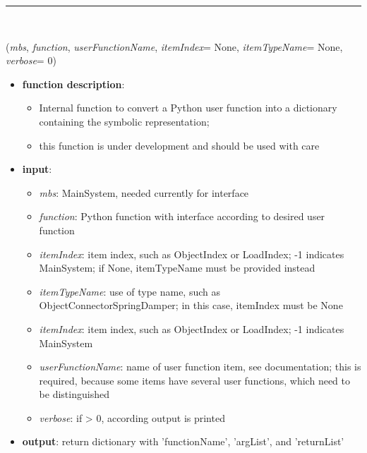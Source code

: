 \begin{itemize}[leftmargin=1.4cm]
%
\noindent\rule{8cm}{0.75pt}\vspace{1pt} \\ 
\begin{flushleft}
\label{sec:advancedUtilities:ConvertFunctionToSymbolic}
({\it mbs}, {\it function}, {\it userFunctionName}, {\it itemIndex}= None, {\it itemTypeName}= None, {\it verbose}= 0)
\end{flushleft}
\setlength{\itemindent}{0.7cm}
\begin{itemize}[leftmargin=0.7cm]
\item[--]
{\bf function description}: \vspace{-6pt}
\begin{itemize}[leftmargin=1.2cm]
\setlength{\itemindent}{-0.7cm}
\item[]Internal function to convert a Python user function into a dictionary containing the symbolic representation;
\item[]this function is under development and should be used with care
\end{itemize}
\item[--]
{\bf input}: \vspace{-6pt}
\begin{itemize}[leftmargin=1.2cm]
\setlength{\itemindent}{-0.7cm}
\item[]{\it mbs}: MainSystem, needed currently for interface
\item[]{\it function}: Python function with interface according to desired user function
\item[]{\it itemIndex}: item index, such as ObjectIndex or LoadIndex; -1 indicates MainSystem; if None, itemTypeName must be provided instead
\item[]{\it itemTypeName}: use of type name, such as ObjectConnectorSpringDamper; in this case, itemIndex must be None
\item[]{\it itemIndex}: item index, such as ObjectIndex or LoadIndex; -1 indicates MainSystem
\item[]{\it userFunctionName}: name of user function item, see documentation; this is required, because some items have several user functions, which need to be distinguished
\item[]{\it verbose}: if > 0, according output is printed
\end{itemize}
\item[--]
{\bf output}: return dictionary with 'functionName', 'argList', and 'returnList'

\end{itemize}
\end{itemize}
